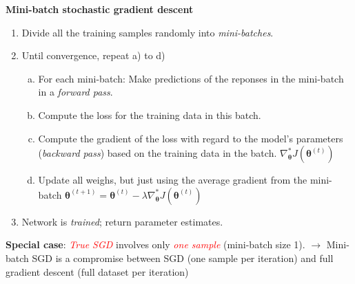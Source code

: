 \documentclass[10pt,ignorenonframetext,]{beamer}
\providecommand{\tightlist}{%
  \setlength{\itemsep}{0pt}\setlength{\parskip}{0pt}}
\begin{document}
\begin{frame}

\textbf{Mini-batch stochastic gradient descent}

\vspace{1mm}

\begin{enumerate}
\tightlist
\item
  Divide all the training samples randomly into \emph{mini-batches}.
\end{enumerate}

\vspace{1mm}

\begin{enumerate}
\setcounter{enumi}{1}
\tightlist
\item
  Until convergence, repeat a) to d)

  \begin{enumerate}
  [a)]
  \tightlist
  \item
    For each mini-batch: Make predictions of the reponses in the
    mini-batch in a \emph{forward pass}.
  \item
    Compute the loss for the training data in this batch.
  \item
    Compute the gradient of the loss with regard to the model's
    parameters (\emph{backward pass}) based on the training data in the
    batch.
    \(\nabla_{\boldsymbol \theta}^* J({\boldsymbol \theta}^{(t)})\)
  \item
    Update all weighs, but just using the average gradient from the
    mini-batch
    \({\boldsymbol \theta}^{(t+1)}={\boldsymbol \theta}^{(t)} - \lambda \nabla_{\boldsymbol \theta} ^* J({\boldsymbol \theta}^{(t)})\)
  \end{enumerate}
\end{enumerate}

\vspace{1mm}

\begin{enumerate}
\setcounter{enumi}{2}
\tightlist
\item
  Network is \emph{trained}; return parameter estimates.
\end{enumerate}

\vspace{6mm}

\textbf{Special case}: \emph{\textcolor{red}{True SGD}} involves only
\emph{\textcolor{red}{one sample}} (mini-batch size 1). \(\rightarrow\)
Mini-batch SGD is a compromise between SGD (one sample per iteration)
and full gradient descent (full dataset per iteration)

\end{frame}
\end{document}
